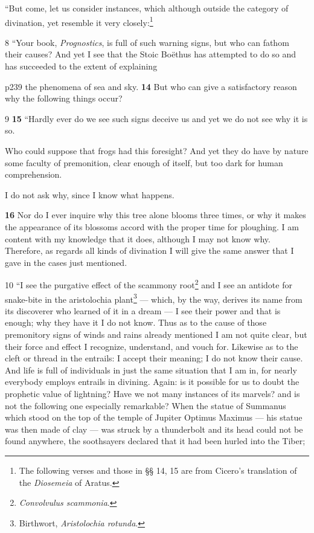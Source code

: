 ``But come, let us consider instances, which although outside the category of divination, yet resemble it very closely:\footnote{The following verses and those in §§ 14, 15 are from Cicero's translation of the \emph{Diosemeia} of Aratus.

}

8
``Your book, \emph{Prognostics}, is full of such warning signs, but who can fathom their causes? And yet I see that the Stoic Boëthus has attempted to do so and has succeeded to the extent of explaining

p239 the phenomena of sea and sky. \textbf{14} But who can give a satisfactory reason why the following things occur?

9
\textbf{15} ``Hardly ever do we see such signs deceive us and yet we do not see why it is so.

Who could suppose that frogs had this foresight? And yet they do have by nature some faculty of premonition, clear enough of itself, but too dark for human comprehension.

I do not ask why, since I know what happens.

\textbf{16} Nor do I ever inquire why this tree alone blooms three times, or why it makes the appearance of its blossoms accord with the proper time for ploughing. I am content with my knowledge that it does, although I may not know why. Therefore, as regards all kinds of divination I will give the same answer that I gave in the cases just mentioned.

10
``I see the purgative effect of the scammony root\texthebrew{}\footnote{\emph{Convolvulus scammonia}.

} and I see an antidote for snake-bite in the aristolochia plant\texthebrew{}\footnote{Birthwort, \emph{Aristolochia rotunda}.

} \texthebrew{—} which, by the way, derives its name from its discoverer who learned of it in a dream \texthebrew{—} I see their power and that is enough; why they have it I do not know. Thus as to the cause of those premonitory signs of winds and rains already mentioned I am not quite clear, but their force and effect I recognize, understand, and vouch for. Likewise as to the cleft or thread in the entrails: I accept their meaning; I do not know their cause. And life is full of individuals in just the same situation that I am in, for nearly everybody employs entrails in divining. Again: is it possible for us to doubt the prophetic value of lightning? Have we not many instances of its marvels? and is not the following one especially remarkable? When the statue of Summanus which stood on the top of the temple of Jupiter Optimus Maximus \texthebrew{—} his statue was then made of clay \texthebrew{—} was struck by a thunderbolt and its head could not be found anywhere, the soothsayers declared that it had been hurled into the Tiber;

